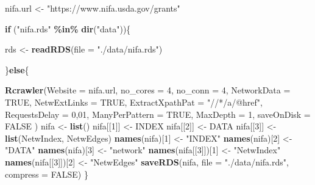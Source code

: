 \documentclass[
]{article}
\newenvironment{Shaded}{\begin{snugshade}}{\end{snugshade}}
\newcommand{\AttributeTok}[1]{\textcolor[rgb]{0.13,0.29,0.53}{#1}}
\newcommand{\ConstantTok}[1]{\textcolor[rgb]{0.56,0.35,0.01}{#1}}
\newcommand{\ControlFlowTok}[1]{\textcolor[rgb]{0.13,0.29,0.53}{\textbf{#1}}}
\newcommand{\DecValTok}[1]{\textcolor[rgb]{0.00,0.00,0.81}{#1}}
\newcommand{\FunctionTok}[1]{\textcolor[rgb]{0.13,0.29,0.53}{\textbf{#1}}}
\newcommand{\NormalTok}[1]{#1}
\newcommand{\OtherTok}[1]{\textcolor[rgb]{0.56,0.35,0.01}{#1}}
\newcommand{\SpecialCharTok}[1]{\textcolor[rgb]{0.81,0.36,0.00}{\textbf{#1}}}
\newcommand{\StringTok}[1]{\textcolor[rgb]{0.31,0.60,0.02}{#1}}
\begin{document}
\begin{Shaded}
\begin{Highlighting}[]
\NormalTok{nifa.url }\OtherTok{\textless{}{-}} \StringTok{"https://www.nifa.usda.gov/grants"}

\ControlFlowTok{if}\NormalTok{ (}\StringTok{"nifa.rds"} \SpecialCharTok{\%in\%} \FunctionTok{dir}\NormalTok{(}\StringTok{"data"}\NormalTok{))\{}

\NormalTok{    rds }\OtherTok{\textless{}{-}} \FunctionTok{readRDS}\NormalTok{(}\AttributeTok{file =} \StringTok{"./data/nifa.rds"}\NormalTok{)}

\NormalTok{\}}\ControlFlowTok{else}\NormalTok{\{}

    \FunctionTok{Rcrawler}\NormalTok{(}\AttributeTok{Website =}\NormalTok{ nifa.url,}
             \AttributeTok{no\_cores =} \DecValTok{4}\NormalTok{, }\AttributeTok{no\_conn =} \DecValTok{4}\NormalTok{, }
             \AttributeTok{NetworkData =} \ConstantTok{TRUE}\NormalTok{,}
             \AttributeTok{NetwExtLinks =} \ConstantTok{TRUE}\NormalTok{, }
             \AttributeTok{ExtractXpathPat =} \StringTok{"//*/a/@href"}\NormalTok{,}
             \AttributeTok{RequestsDelay =} \DecValTok{0}\NormalTok{,}\DecValTok{01}\NormalTok{,}
             \AttributeTok{ManyPerPattern =} \ConstantTok{TRUE}\NormalTok{, }\AttributeTok{MaxDepth =} \DecValTok{1}\NormalTok{, }
             \AttributeTok{saveOnDisk =} \ConstantTok{FALSE}
\NormalTok{             )}
\NormalTok{    nifa }\OtherTok{\textless{}{-}} \FunctionTok{list}\NormalTok{()}
\NormalTok{    nifa[[}\DecValTok{1}\NormalTok{]] }\OtherTok{\textless{}{-}}\NormalTok{ INDEX}
\NormalTok{    nifa[[}\DecValTok{2}\NormalTok{]] }\OtherTok{\textless{}{-}}\NormalTok{ DATA}
\NormalTok{    nifa[[}\DecValTok{3}\NormalTok{]] }\OtherTok{\textless{}{-}} \FunctionTok{list}\NormalTok{(NetwIndex, NetwEdges)}
    \FunctionTok{names}\NormalTok{(nifa)[}\DecValTok{1}\NormalTok{] }\OtherTok{\textless{}{-}} \StringTok{"INDEX"}
    \FunctionTok{names}\NormalTok{(nifa)[}\DecValTok{2}\NormalTok{] }\OtherTok{\textless{}{-}} \StringTok{"DATA"}
    \FunctionTok{names}\NormalTok{(nifa)[}\DecValTok{3}\NormalTok{] }\OtherTok{\textless{}{-}} \StringTok{"network"}
    \FunctionTok{names}\NormalTok{(nifa[[}\DecValTok{3}\NormalTok{]])[}\DecValTok{1}\NormalTok{] }\OtherTok{\textless{}{-}} \StringTok{"NetwIndex"}
    \FunctionTok{names}\NormalTok{(nifa[[}\DecValTok{3}\NormalTok{]])[}\DecValTok{2}\NormalTok{] }\OtherTok{\textless{}{-}} \StringTok{"NetwEdges"}
    \FunctionTok{saveRDS}\NormalTok{(nifa, }\AttributeTok{file =} \StringTok{"./data/nifa.rds"}\NormalTok{, }\AttributeTok{compress =} \ConstantTok{FALSE}\NormalTok{)}
\NormalTok{\}}
\end{Highlighting}
\end{Shaded}
\end{document}
